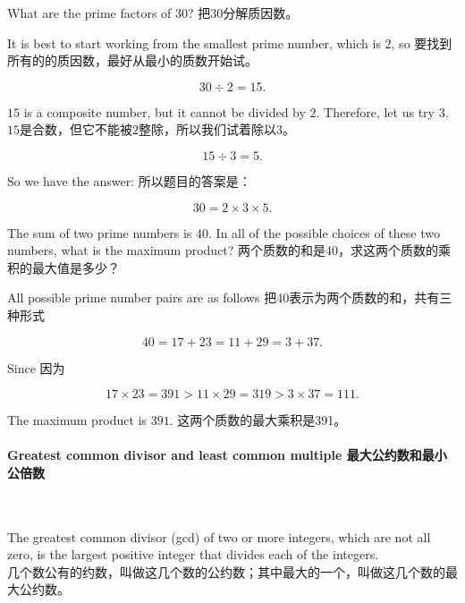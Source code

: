 \begin{example}
What are the prime factors of $30$? 把30分解质因数。
\end{example}
\begin{solution}
\begin{paracol}{2}
It is best to start working from the smallest prime number, which is $2$, so 
\switchcolumn 
要找到所有的的质因数，最好从最小的质数开始试。
\end{paracol}
$$
30\div 2 = 15.
$$
\begin{paracol}{2}
$15$ is a composite number, but it cannot be divided by $2$. Therefore, let us try $3$.
\switchcolumn 
$15$是合数，但它不能被$2$整除，所以我们试着除以$3$。
\end{paracol}
$$
15\div 3 = 5.
$$
\begin{paracol}{2}
So we have the answer:
\switchcolumn 
所以题目的答案是：
\end{paracol}
$$
30 = 2\times 3\times 5. 
$$
\end{solution}

\begin{example}
The sum of two prime numbers is $40$. In all of the possible choices of these two numbers, what is the maximum  product? 两个质数的和是40，求这两个质数的乘积的最大值是多少？
\end{example}
\begin{solution}
\begin{paracol}{2}
All possible prime number pairs are as follows
\switchcolumn 
把40表示为两个质数的和，共有三种形式
\end{paracol}
$$
40 = 17 + 23 = 11+29 = 3+37.
$$
\begin{paracol}{2}
Since
\switchcolumn 
因为
\end{paracol}
$$
17\times 23 = 391 > 11\times 29 = 319> 3\times 37 = 111.
$$
\begin{paracol}{2}
The maximum product is $391$.
\switchcolumn 
这两个质数的最大乘积是391。
\end{paracol}
\end{solution}

\paragraph{Greatest common divisor and least common multiple 最大公约数和最小公倍数}
\ \ 

\begin{newdef}
The greatest common divisor (gcd) of two or more integers, which are not all zero, is the largest positive integer that divides each of the integers. \\
几个数公有的约数，叫做这几个数的公约数；其中最大的一个，叫做这几个数的最大公约数。
\end{newdef}

